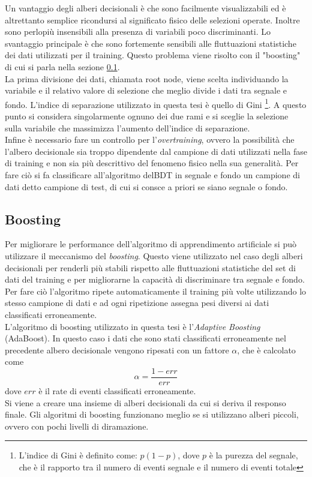     Un vantaggio degli alberi decisionali è che sono facilmente visualizzabili ed è altrettanto semplice ricondursi al significato fisico delle selezioni operate. Inoltre sono perlopiù insensibili alla presenza di variabili poco discriminanti. Lo svantaggio principale è che sono fortemente sensibili alle fluttuazioni statistiche dei dati utilizzati per il training. Questo problema viene risolto con il "boosting" di cui si parla nella sezione  \ref{Boosting}.
    \\La prima divisione dei dati, chiamata root node, viene scelta individuando la variabile e il relativo valore di selezione che meglio divide i dati tra segnale e fondo. L'indice di separazione utilizzato in questa tesi è quello di Gini \footnote{L'indice di Gini è definito come: $p (1-p)$, dove $p$ è la purezza del segnale, che è il rapporto tra il numero di eventi segnale e il numero di eventi totale}. A questo punto si considera singolarmente ognuno dei due rami e si sceglie la selezione sulla variabile che massimizza l'aumento dell'indice di separazione.
    \\Infine è necessario fare un controllo per l'\textit{overtraining}, ovvero la possibilità che l'albero decisionale sia troppo dipendente dal campione di dati utilizzati nella fase di training e non sia più descrittivo del fenomeno fisico nella sua generalità. Per fare ciò si fa classificare all'algoritmo delBDT in segnale e fondo un campione di dati detto campione di test, di cui si consce a priori se siano segnale o fondo.
 
    \subsection{Boosting} \label{Boosting}
    Per migliorare le performance dell'algoritmo di apprendimento artificiale si pu\`o utilizzare il meccanismo del \textit{boosting}. Questo viene utilizzato nel caso degli alberi decisionali per renderli più stabili rispetto alle fluttuazioni statistiche del set di dati del training e per migliorarne la capacit\`a di discriminare tra segnale e fondo. Per fare ciò l'algoritmo ripete automaticamente il training pi\`u volte utilizzando lo stesso campione di dati e ad ogni ripetizione assegna pesi diversi ai dati classificati erroneamente.
    \\L'algoritmo di boosting utilizzato in questa tesi è l'\textit{Adaptive Boosting} (AdaBoost). In questo caso i dati che sono stati classificati erroneamente nel precedente albero decisionale vengono ripesati con un fattore $\alpha$, che è calcolato come 
        \begin{equation}
            \alpha = \frac{1 - err}{err}
        \end{equation}
    dove $err$ è il rate di eventi classificati erroneamente. 
    \\Si viene a creare una insieme di alberi decisionali da cui si deriva il responso finale. Gli algoritmi di boosting funzionano meglio se si utilizzano alberi piccoli, ovvero con pochi livelli di diramazione.
    
